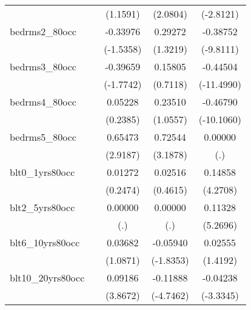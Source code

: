 \documentclass{article}
\begin{document}
{\begin{longtable}{l*{4}{c}}
                    &                     &    (1.1591)         &    (2.0804)         &   (-2.8121)         \\
[1em]
bedrms2\_80occ       &                     &    -0.33976         &     0.29272         &    -0.38752\sym{***}\\
                    &                     &   (-1.5358)         &    (1.3219)         &   (-9.8111)         \\
[1em]
bedrms3\_80occ       &                     &    -0.39659         &     0.15805         &    -0.44504\sym{***}\\
                    &                     &   (-1.7742)         &    (0.7118)         &  (-11.4990)         \\
[1em]
bedrms4\_80occ       &                     &     0.05228         &     0.23510         &    -0.46790\sym{***}\\
                    &                     &    (0.2385)         &    (1.0557)         &  (-10.1060)         \\
[1em]
bedrms5\_80occ       &                     &     0.65473\sym{**} &     0.72544\sym{**} &     0.00000         \\
                    &                     &    (2.9187)         &    (3.1878)         &         (.)         \\
[1em]
blt0\_1yrs80occ      &                     &     0.01272         &     0.02516         &     0.14858\sym{***}\\
                    &                     &    (0.2474)         &    (0.4615)         &    (4.2708)         \\
[1em]
blt2\_5yrs80occ      &                     &     0.00000         &     0.00000         &     0.11328\sym{***}\\
                    &                     &         (.)         &         (.)         &    (5.2696)         \\
[1em]
blt6\_10yrs80occ     &                     &     0.03682         &    -0.05940         &     0.02555         \\
                    &                     &    (1.0871)         &   (-1.8353)         &    (1.4192)         \\
[1em]
blt10\_20yrs80occ    &                     &     0.09186\sym{***}&    -0.11888\sym{***}&    -0.04238\sym{***}\\
                    &                     &    (3.8672)         &   (-4.7462)         &   (-3.3345)         \\

\end{longtable}}
\end{document}
